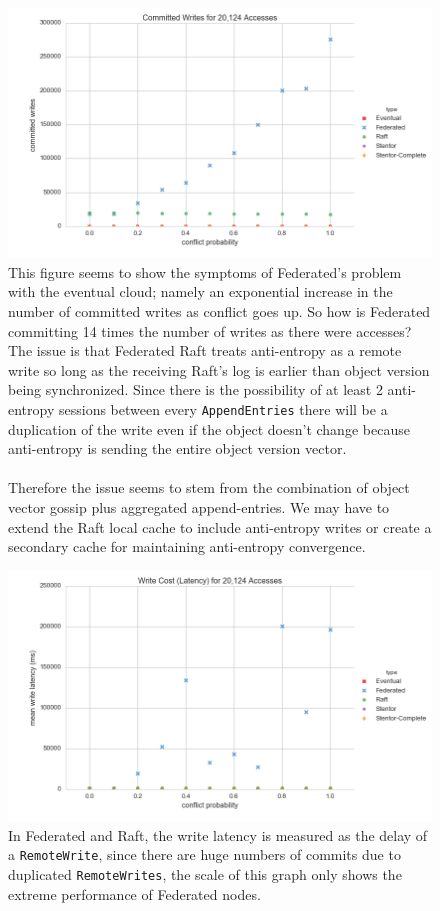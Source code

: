 \documentclass[11pt,letterpaper]{article}
\begin{document}
\begin{figure}[!h]
    \centering
        \includegraphics[width=\textwidth]{figures/committed_writes.png}
        \caption{\textsf{This figure seems to show the symptoms of Federated's problem with the eventual cloud; namely an exponential increase in the number of committed writes as conflict goes up. So how is Federated committing 14 times the number of writes as there were accesses? The issue is that Federated Raft treats anti-entropy as a remote write so long as the receiving Raft's log is earlier than object version being synchronized. Since there is the possibility of at least 2 anti-entropy sessions between every \texttt{AppendEntries} there will be a duplication of the write even if the object doesn't change because anti-entropy is sending the entire object version vector.\\
\\
        Therefore the issue seems to stem from the combination of object vector gossip plus aggregated append-entries. We may have to extend the Raft local cache to include anti-entropy writes or create a secondary cache for maintaining anti-entropy convergence.}}
        \label{fig:committed_writes}
\end{figure}

\begin{figure}[!h]
    \centering
        \includegraphics[width=\textwidth]{figures/write_latency.png}
        \caption{\textsf{In Federated and Raft, the write latency is measured as the delay of a \texttt{RemoteWrite}, since there are huge numbers of commits due to duplicated \texttt{RemoteWrites}, the scale of this graph only shows the extreme performance of Federated nodes.}}
        \label{fig:write_latency}
\end{figure}
\end{document}
